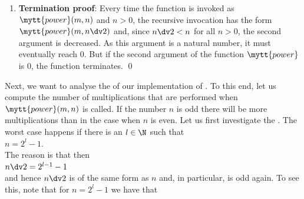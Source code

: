 \begin{enumerate}
\begin{enumerate}
            Then there exists a number $k \in \N$ such that $n = 2 \cdot k + 1$ and we have
            $n \dv 2 = k$.  In this case we have:
            \\[0.2cm]
            \hspace*{1.3cm}
            $ 
            \begin{array}{lcl}
            \mytt{power}(m,n) & = & \mytt{power}(m,k) \cdot \mytt{power}(m,k) \cdot m  \\[0.2cm]
                                & \stackrel{\mathrm{IH}}{=} & m^k \cdot m^k \cdot m  \\[0.2cm]
                                & = & m^{2\cdot k+1} \\[0.2cm]
                                & = & m^{n}.
            \end{array}
            $
      \end{enumerate}
      As we have shown that $\mytt{power}(m,n) = m^n$ in both cases, the induction step is finished. \mycheck
\item \textbf{Termination proof}:
      Every time the function  is invoked as $\mytt{power}(m, n)$ and $n > 0$, the recursive
      invocation has the form $\mytt{power}(m,n \dv 2)$ and, since $n \dv 2 < n$ for all $n > 0$, the second
      argument is decreased.  As this argument is a natural number, it must eventually reach $0$.  But if the
      second argument of the function $\mytt{power}$ is $0$, the function terminates. \mycheck
      \qed
\end{enumerate}
Next, we want to analyse the  of our implementation of .
To this end, let us compute the number of multiplications that are performed when
$\mytt{power}(m,n)$ is called.  If the number $n$ is odd there will be more multiplications than
in the case when $n$ is even.  Let us first investigate the .  
The worst case happens if there is an $l\in \N$ such that 
\\[0.2cm]
\hspace*{1.3cm}
$n = 2^l - 1$. 
\\[0.2cm]
The reason is that then
\\[0.2cm]
\hspace*{1.3cm} $n \dv 2 = 2^{l-1} - 1$
\\[0.2cm]
and hence $n \dv 2$ is of the same form as $n$ and, in particular, is odd again.  To see this, note that
for $n = 2^l - 1$ we have that
\\[0.2cm]
\hspace*{1.3cm}
